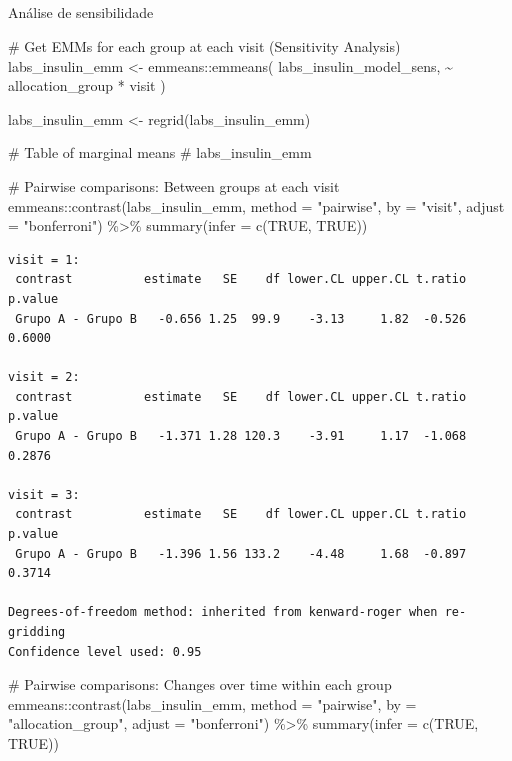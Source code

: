 \documentclass[
  12pt,
]{article}
\makeatletter
\let\oldsubparagraph\subparagraph
\renewcommand{\subparagraph}{
    \@ifstar
      \xxxSubParagraphStar
      \xxxSubParagraphNoStar
  }
\newcommand{\xxxSubParagraphStar}[1]{\oldsubparagraph*{#1}\mbox{}}
\newcommand{\xxxSubParagraphNoStar}[1]{\oldsubparagraph{#1}\mbox{}}
\newenvironment{Shaded}{\begin{snugshade}}{\end{snugshade}}
\newcommand{\AttributeTok}[1]{\textcolor[rgb]{0.40,0.45,0.13}{#1}}
\newcommand{\CommentTok}[1]{\textcolor[rgb]{0.37,0.37,0.37}{#1}}
\newcommand{\ConstantTok}[1]{\textcolor[rgb]{0.56,0.35,0.01}{#1}}
\newcommand{\FunctionTok}[1]{\textcolor[rgb]{0.28,0.35,0.67}{#1}}
\newcommand{\NormalTok}[1]{\textcolor[rgb]{0.00,0.23,0.31}{#1}}
\newcommand{\OtherTok}[1]{\textcolor[rgb]{0.00,0.23,0.31}{#1}}
\newcommand{\SpecialCharTok}[1]{\textcolor[rgb]{0.37,0.37,0.37}{#1}}
\newcommand{\StringTok}[1]{\textcolor[rgb]{0.13,0.47,0.30}{#1}}
\makeatother
\begin{document}
\subparagraph{Análise de
sensibilidade}\label{anuxe1lise-de-sensibilidade-10}

\begin{Shaded}
\begin{Highlighting}[]
\CommentTok{\# Get EMMs for each group at each visit (Sensitivity Analysis)}
\NormalTok{labs\_insulin\_emm }\OtherTok{\textless{}{-}}\NormalTok{ emmeans}\SpecialCharTok{::}\FunctionTok{emmeans}\NormalTok{(}
\NormalTok{    labs\_insulin\_model\_sens, }
    \SpecialCharTok{\textasciitilde{}}\NormalTok{ allocation\_group }\SpecialCharTok{*}\NormalTok{ visit}
\NormalTok{)}

\NormalTok{labs\_insulin\_emm }\OtherTok{\textless{}{-}} \FunctionTok{regrid}\NormalTok{(labs\_insulin\_emm)}

\CommentTok{\# Table of marginal means}
\CommentTok{\# labs\_insulin\_emm}

\CommentTok{\# Pairwise comparisons: Between groups at each visit}
\NormalTok{emmeans}\SpecialCharTok{::}\FunctionTok{contrast}\NormalTok{(labs\_insulin\_emm,}
\AttributeTok{method =} \StringTok{"pairwise"}\NormalTok{, }\AttributeTok{by =} \StringTok{"visit"}\NormalTok{,}
\AttributeTok{adjust =} \StringTok{"bonferroni"}\NormalTok{) }\SpecialCharTok{\%\textgreater{}\%} \FunctionTok{summary}\NormalTok{(}\AttributeTok{infer =} \FunctionTok{c}\NormalTok{(}\ConstantTok{TRUE}\NormalTok{, }\ConstantTok{TRUE}\NormalTok{))}
\end{Highlighting}
\end{Shaded}

\begin{verbatim}
visit = 1:
 contrast          estimate   SE    df lower.CL upper.CL t.ratio p.value
 Grupo A - Grupo B   -0.656 1.25  99.9    -3.13     1.82  -0.526  0.6000

visit = 2:
 contrast          estimate   SE    df lower.CL upper.CL t.ratio p.value
 Grupo A - Grupo B   -1.371 1.28 120.3    -3.91     1.17  -1.068  0.2876

visit = 3:
 contrast          estimate   SE    df lower.CL upper.CL t.ratio p.value
 Grupo A - Grupo B   -1.396 1.56 133.2    -4.48     1.68  -0.897  0.3714

Degrees-of-freedom method: inherited from kenward-roger when re-gridding 
Confidence level used: 0.95 
\end{verbatim}

\begin{Shaded}
\begin{Highlighting}[]
\CommentTok{\# Pairwise comparisons: Changes over time within each group}
\NormalTok{emmeans}\SpecialCharTok{::}\FunctionTok{contrast}\NormalTok{(labs\_insulin\_emm,}
\AttributeTok{method =} \StringTok{"pairwise"}\NormalTok{, }\AttributeTok{by =} \StringTok{"allocation\_group"}\NormalTok{,}
\AttributeTok{adjust =} \StringTok{"bonferroni"}\NormalTok{) }\SpecialCharTok{\%\textgreater{}\%} \FunctionTok{summary}\NormalTok{(}\AttributeTok{infer =} \FunctionTok{c}\NormalTok{(}\ConstantTok{TRUE}\NormalTok{, }\ConstantTok{TRUE}\NormalTok{))}
\end{Highlighting}
\end{Shaded}
\end{document}
